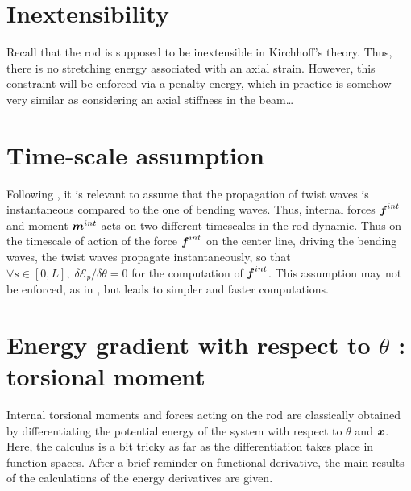 
\section{Inextensibility}
Recall that the rod is supposed to be inextensible in Kirchhoff’s theory. Thus, there is no stretching energy associated with an axial strain. However, this constraint will be enforced via a penalty energy, which in practice is somehow very similar as considering an axial stiffness in the beam…

\section{Time-scale assumption}
Following \cite{Bergou2008}, it is relevant to assume that the propagation of twist waves is instantaneous compared to the one of bending waves. Thus, internal forces $\boldsymbol{f}^{int}$ and moment $\boldsymbol{m}^{int}$ acts on two different timescales in the rod dynamic. Thus on the timescale of action of the force $\boldsymbol{f}^{int}$ on the center line, driving the bending waves, the twist waves propagate instantaneously, so that $\forall s \in [0,L],\; \delta\mathcal{E}_{p}/\delta\theta=0$ for the computation of $\boldsymbol{f}^{int}$. This assumption may not be enforced, as in \cite{Nabei2014}, but leads to simpler and faster computations.

\section{Energy gradient with respect to $\theta$ : torsional moment}
Internal torsional moments and forces acting on the rod are classically obtained by differentiating the potential energy of the system with respect to $\theta$ and $\boldsymbol{x}$. Here, the calculus is a bit tricky as far as the differentiation takes place in function spaces. After a brief reminder on functional derivative, the main results of the calculations of the energy derivatives are given.

